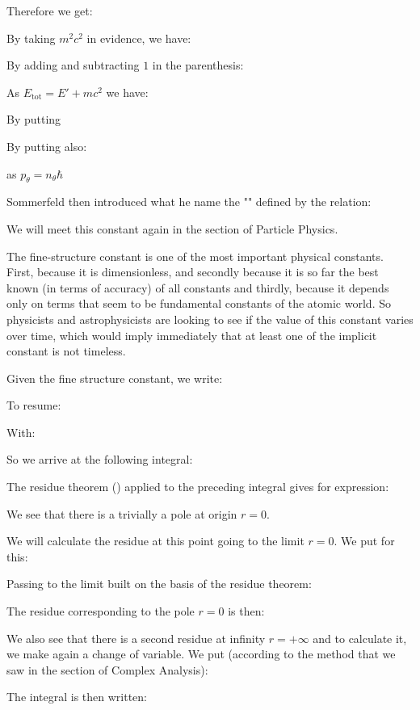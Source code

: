 	Therefore we get:
	
	By taking $m^2c^2$ in evidence, we have:
	
	By adding and subtracting $1$ in the parenthesis:
	
	
	As $E_\text{tot}=E'+mc^2$ we have:
	
	By putting
	
	By putting also:
	
	as $p_\theta=n_\theta\hbar$

	Sommerfeld then introduced what he name the "" defined by the relation:
	
	We will meet this constant again in the section of Particle Physics.
	\begin{tcolorbox}[title=Remark,colframe=black,arc=10pt]
	The fine-structure constant is one of the most important physical constants. First, because it is dimensionless, and secondly because it is so far the best known (in terms of accuracy) of all constants and thirdly, because it depends only on terms that seem to be fundamental constants of the atomic world. So physicists and astrophysicists are looking to see if the value of this constant varies over time, which would imply immediately that at least one of the implicit constant is not timeless.
	\end{tcolorbox}
	Given the fine structure constant, we write:
	
	To resume:
	
	With:
	
	So we arrive at the following integral:
	
	The residue theorem () applied to the preceding integral gives for expression:
	
	We see that there is a trivially a pole at origin $r=0$.

	We will calculate the residue at this point going to the limit $r=0$. We put for this:
	
	Passing to the limit built on the basis of the residue theorem:
	
	The residue corresponding to the pole $r=0$ is then:
	
	We also see that there is a second residue at infinity $r=+\infty$ and to calculate it, we make again a change of variable. We put (according to the method that we saw in the section of Complex  Analysis):
	
	The integral is then written:
	
